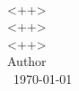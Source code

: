 \begin{titlepage}
  \begin{center}
    \vspace*{3cm}
    \thispagestyle{empty}
    \Large{\
    <++>\\
    \Large
    <++>\\
    \Large
    <++>\\
    \Large
    <++>\\
    \Large
	Author\\
    \vfill
    \longdate\
    \today
  }
  \end{center}
\end{titlepage}

\newpage
\begin{center}
\tableofcontents
\end{center}

\newpage
{}
\setcounter{page}{1}
\pagestyle{fancy}

